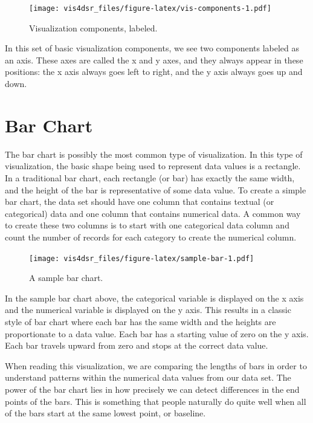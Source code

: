 \documentclass[
]{krantz}
\begin{document}
\begin{figure}
\centering
\texttt{[image: vis4dsr\_files/figure-latex/vis-components-1.pdf]}
\caption{\label{fig:vis-components}Visualization components, labeled.}
\end{figure}

In this set of basic visualization components, we see two components labeled as an axis.
These axes are called the x and y axes, and they always appear in these positions:
the x axis always goes left to right, and the y axis always goes up and down.

\hypertarget{bar-chart}{%
\section{Bar Chart}\label{bar-chart}}

The bar chart is possibly the most common type of visualization. In this type
of visualization, the basic shape being used to represent data values is a rectangle.
In a traditional bar chart, each rectangle (or bar) has exactly the same width,
and the height of the bar is representative of some data value. To create a simple
bar chart, the data set should have one column that contains textual (or categorical)
data and one column that contains numerical data. A common way to create these two columns
is to start with one categorical data column and count the number of records for each
category to create the numerical column.

\begin{figure}
\centering
\texttt{[image: vis4dsr\_files/figure-latex/sample-bar-1.pdf]}
\caption{\label{fig:sample-bar}A sample bar chart.}
\end{figure}

In the sample bar chart above, the categorical variable is displayed on the
x axis and the numerical variable is displayed on the y axis. This results in a
classic style of bar chart where each bar has the same width and the heights are
proportionate to a data value. Each bar has a starting value of zero on the y axis.
Each bar travels upward from zero and stops at the correct data value.

When reading this visualization, we are comparing the lengths of bars in order to
understand patterns within the numerical data values from our data set. The power
of the bar chart lies in how precisely we can detect differences in the
end points of the bars. This is something that people naturally do quite well
when all of the bars start at the same lowest point, or baseline.
\end{document}

